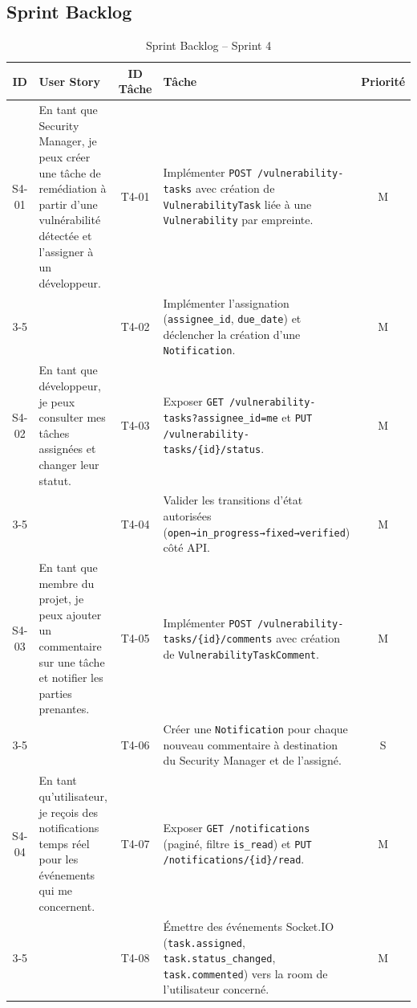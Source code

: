 \subsection{Sprint Backlog}
\begin{table}[H]
\centering
\caption{Sprint Backlog -- Sprint 4}
\label{tab:sprint4-backlog}
\small
\renewcommand{\arraystretch}{1.3}
\begin{tabularx}{\textwidth}{c X c X c}
\hline
\rowcolor{gray!15}
\textbf{ID} & \textbf{User Story} & \textbf{ID Tâche} & \textbf{Tâche} & \textbf{Priorité} \\
\hline
S4-01 & En tant que Security Manager, je peux créer une tâche de remédiation à partir d'une vulnérabilité détectée et l'assigner à un développeur.
  & T4-01 & Implémenter \texttt{POST /vulnerability-tasks} avec création de \texttt{VulnerabilityTask} liée à une \texttt{Vulnerability} par empreinte. & M \\
\cline{3-5}
  & & T4-02 & Implémenter l'assignation (\texttt{assignee\_id}, \texttt{due\_date}) et déclencher la création d'une \texttt{Notification}. & M \\
\hline
S4-02 & En tant que développeur, je peux consulter mes tâches assignées et changer leur statut.
  & T4-03 & Exposer \texttt{GET /vulnerability-tasks?assignee\_id=me} et \texttt{PUT /vulnerability-tasks/\{id\}/status}. & M \\
\cline{3-5}
  & & T4-04 & Valider les transitions d'état autorisées (\texttt{open→in\_progress→fixed→verified}) côté API. & M \\
\hline
S4-03 & En tant que membre du projet, je peux ajouter un commentaire sur une tâche et notifier les parties prenantes.
  & T4-05 & Implémenter \texttt{POST /vulnerability-tasks/\{id\}/comments} avec création de \texttt{VulnerabilityTaskComment}. & M \\
\cline{3-5}
  & & T4-06 & Créer une \texttt{Notification} pour chaque nouveau commentaire à destination du Security Manager et de l'assigné. & S \\
\hline
S4-04 & En tant qu'utilisateur, je reçois des notifications temps réel pour les événements qui me concernent.
  & T4-07 & Exposer \texttt{GET /notifications} (paginé, filtre \texttt{is\_read}) et \texttt{PUT /notifications/\{id\}/read}. & M \\
\cline{3-5}
  & & T4-08 & Émettre des événements Socket.IO (\texttt{task.assigned}, \texttt{task.status\_changed}, \texttt{task.commented}) vers la room de l'utilisateur concerné. & M \\
\hline
\end{tabularx}
\end{table}


